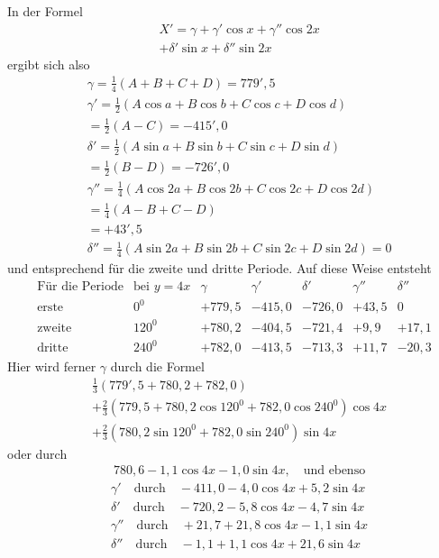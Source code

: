 In der Formel
\[
\begin{aligned}
&X'={}\gamma+\gamma'\cos x+\gamma''\cos2x\\[5pt]
&+\delta'\sin x+\delta''\sin2x
\end{aligned}
\]
ergibt sich also
\[
\begin{aligned}
&\gamma=\tfrac14(A+B+C+D)=779'{,}5\\[5pt]
&\gamma'=\tfrac12(A\cos a+B\cos b+C\cos c+D\cos d)\\[5pt]
&=\tfrac12(A-C)=-415'{,}0\\[5pt]
&\delta'=\tfrac12(A\sin a+B\sin b+C\sin c+D\sin d)\\[5pt]
&=\tfrac12(B-D)=-726'{,}0\\[5pt]
&\gamma''=\tfrac14(A\cos2a+B\cos2b+C\cos2c+D\cos2d)\\[5pt]
&=\tfrac14(A-B+C-D)\\[5pt]
&=+43'{,}5\\[5pt]
&\delta''=\tfrac14(A\sin2a+B\sin2b+C\sin2c+D\sin2d)=0
\end{aligned}
\]
und entsprechend für die zweite und dritte Periode. Auf diese Weise entsteht
{\small\setlength{\arraycolsep}{3pt}\[
\begin{array}{l|r|r|r|r|r|r}
\text{Für die Periode}&\text{bei }y=4x&\gamma&\gamma'&\delta'&\gamma''&\delta''\\ \hline
\text{erste}&0^{\mathord{0}}&+779{,}5&-415{,}0&-726{,}0&+43{,}5&0\\
\text{zweite}&120^{\mathord{0}}&+780{,}2&-404{,}5&-721{,}4&+9{,}9&+17{,}1\\
\text{dritte}&240^{\mathord{0}}&+782{,}0&-413{,}5&-713{,}3&+11{,}7&-20{,}3
\end{array}
\]}
Hier wird ferner $\gamma$ durch die Formel
\[
\begin{aligned}
&\tfrac13(779'{,}5+780{,}2+782{,}0)\\[5pt]
&+\tfrac23(779{,}5+780{,}2\cos120^{\mathord{0}}+782{,}0\cos240^{\mathord{0}})\cos4x\\[5pt]
&+\tfrac23(780{,}2\sin120^{\mathord{0}}+782{,}0\sin240^{\mathord{0}})\sin4x
\end{aligned}
\]
oder durch
\[
\begin{aligned}
&780{,}6-1{,}1\cos4x-1{,}0\sin4x,\quad\text{und ebenso}
\end{aligned}
\]
\[
\begin{aligned}
&\gamma'\quad\text{durch}\quad-411{,}0-4{,}0\cos4x+5{,}2\sin4x\\[5pt]
&\delta'\quad\text{durch}\quad-720{,}2-5{,}8\cos4x-4{,}7\sin4x\\[5pt]
&\gamma''\quad\text{durch}\quad+21{,}7+21{,}8\cos4x-1{,}1\sin4x\\[5pt]
&\delta''\quad\text{durch}\quad-1{,}1+1{,}1\cos4x+21{,}6\sin4x
\end{aligned}
\]
